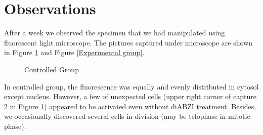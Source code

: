 \documentclass[UTF-8]{article}
\begin{document}
\section{Observations}
After a week we observed the specimen that we had manipulated using fluorescent light microscope.
The pictures captured under microscope are shown in Figure \ref{controlled group} and Figure \ref{Experimental group}.
 \begin{figure}[h]
    \centering
    \caption{Controlled Group}  
    \label{controlled group}
 \end{figure}

In controlled group, the fluorescence was equally and evenly distributed in cytosol except nucleus.
However, a few of unexpected cells (upper right corner of capture 2 in Figure \ref{controlled group}) appeared to be activated even without diABZI treatment.
Besides, we occasionally discovered several cells in division (may be telophase in mitotic phase).
\end{document}
